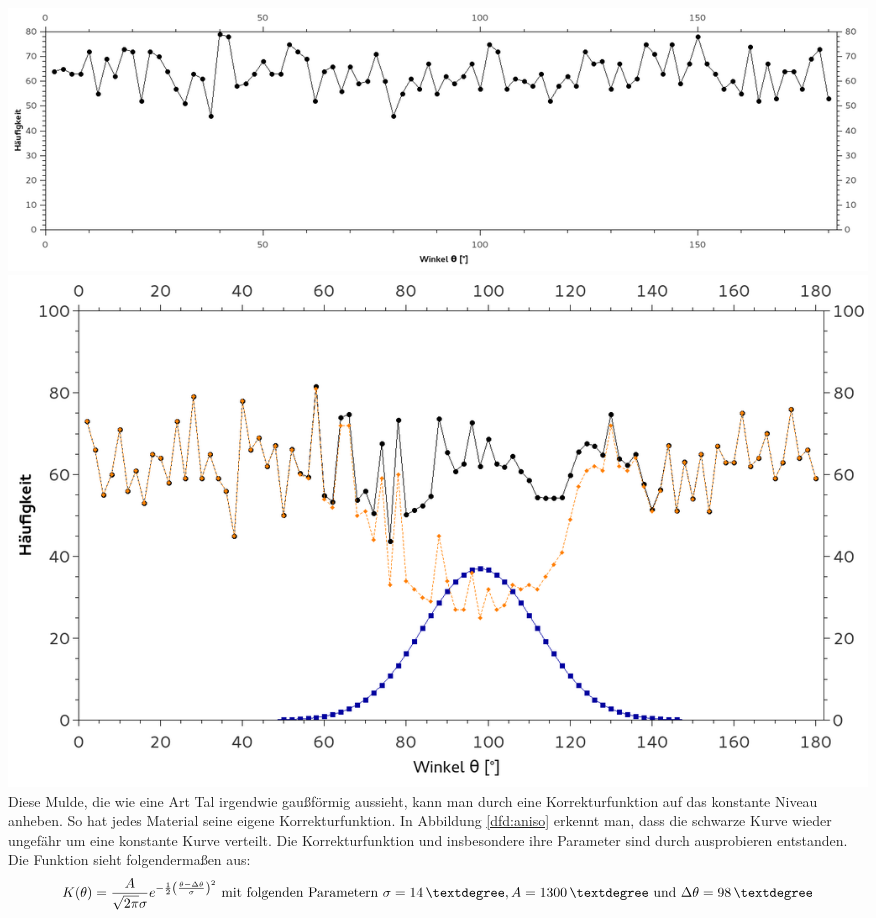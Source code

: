         \centering \includegraphics[width=.72\textwidth, height=0.225\textheight]{pic/isotropie.png}
        \label{dfd:iso}
        \centering \includegraphics[width=.75\textwidth, height=0.25\textheight]{pic/KorrekturderAnisotropie.png}
        \label{dfd:aniso}
        \flushleft
        Diese Mulde, die wie eine Art Tal irgendwie gaußförmig aussieht, kann man durch eine Korrekturfunktion auf das konstante Niveau anheben. So hat jedes Material seine eigene Korrekturfunktion.
        In Abbildung \ref{dfd:aniso} erkennt man, dass die schwarze Kurve wieder ungefähr um eine konstante Kurve verteilt.
        Die Korrekturfunktion und insbesondere ihre Parameter sind durch ausprobieren entstanden. Die Funktion sieht folgendermaßen aus: 
        \begin{equation*}
            K(\theta) = \frac{A}{\sqrt{2\pi}\sigma} e^{-\frac{1}{2}\left(\frac{\theta - \Delta \theta}{\sigma}\right)^2} \text{ mit folgenden Parametern } \sigma=\unit[14]{°}, A=\unit[1300]{°} \text{ und } \Delta \theta = \unit[98]{°}
        \end{equation*}
        
        